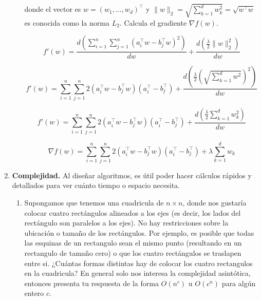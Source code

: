 \documentclass[12pt]{exam}
\begin{document}
\begin{enumerate}
\begin{enumerate}[label=f.]
\justify
donde el vector es $w = (w_1,...,w_d)^\top$ y $\|w\|_2 = \sqrt{\sum_{k=1}^d w_k^2} = \sqrt{w^\top w}$ es conocida como la norma $L_2$. Calcula el gradiente $\nabla f(w)$.

\begin{equation}
    f'(w) = \frac{d(\sum_{i=1}^n\sum_{j=1}^n (a_i^\top w - b_j^\top w)^2)}{dw} + \frac{d(\frac{\lambda}{2} \|{w}\|_2^2)}{dw}
\end{equation}

\begin{equation}
    f'(w) = \sum_{i=1}^n\sum_{j=1}^n 2(a_i^\top w - b_j^\top w)(a_i^\top - b_j^\top) + \frac{d(\frac{\lambda}{2} (\sqrt{\sum_{k=1}^d w^2})^2)}{dw}
\end{equation}

\begin{equation}
    f'(w) = \sum_{i=1}^n\sum_{j=1}^n 2(a_i^\top w - b_j^\top w)(a_i^\top - b_j^\top) + \frac{d(\frac{\lambda}{2} \sum_{k=1}^d w_k^2)}{dw}
\end{equation}

\begin{equation}
    \nabla f(w) = \sum_{i=1}^n\sum_{j=1}^n 2(a_i^\top w - b_j^\top w)(a_i^\top - b_j^\top) + \lambda \sum_{k=1}^d w_k
\end{equation}

\end{enumerate}

\item \textbf{Complejidad.} Al diseñar algoritmos, es \'util poder hacer c\'alculos r\'apidos y detallados para ver cu\'anto tiempo o espacio necesita.

\justify
\begin{enumerate}[label=a.]
\item Supongamos que tenemos una cuadricula de $n \times n$, donde nos gustar\'ia colocar cuatro rect\'angulos alineados a los ejes (es decir, los lados del rect\'angulo son paralelos a los ejes). No hay restricciones sobre la ubicaci\'on o tamaño de los rect\'angulos. Por ejemplo, es posible que todas las esquinas de un rectangulo sean el mismo punto (resultando en un rectangulo de tamaño cero) o que los cuatro rect\'angulos se traslapen entre si. ¿Cu\'antas formas distintas hay de colocar los cuatro rectangulos en la cuadricula? En general solo nos interesa la complejidad asint\'otica, entonces presenta tu respuesta de la forma $O(n^c)$ u $O(c^n)$ para alg\'un entero $c$.


\end{enumerate}


\end{enumerate}
\end{document}
